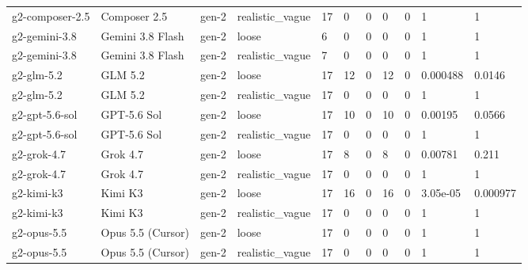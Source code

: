 \begin{tabular}{lllllllllll}
g2-composer-2.5 & Composer 2.5 & gen-2 & realistic\_vague & 17 & 0 & 0 & 0 & 0 & 1 & 1 \\
g2-gemini-3.8 & Gemini 3.8 Flash & gen-2 & loose & 6 & 0 & 0 & 0 & 0 & 1 & 1 \\
g2-gemini-3.8 & Gemini 3.8 Flash & gen-2 & realistic\_vague & 7 & 0 & 0 & 0 & 0 & 1 & 1 \\
g2-glm-5.2 & GLM 5.2 & gen-2 & loose & 17 & 12 & 0 & 12 & 0 & 0.000488 & 0.0146 \\
g2-glm-5.2 & GLM 5.2 & gen-2 & realistic\_vague & 17 & 0 & 0 & 0 & 0 & 1 & 1 \\
g2-gpt-5.6-sol & GPT-5.6 Sol & gen-2 & loose & 17 & 10 & 0 & 10 & 0 & 0.00195 & 0.0566 \\
g2-gpt-5.6-sol & GPT-5.6 Sol & gen-2 & realistic\_vague & 17 & 0 & 0 & 0 & 0 & 1 & 1 \\
g2-grok-4.7 & Grok 4.7 & gen-2 & loose & 17 & 8 & 0 & 8 & 0 & 0.00781 & 0.211 \\
g2-grok-4.7 & Grok 4.7 & gen-2 & realistic\_vague & 17 & 0 & 0 & 0 & 0 & 1 & 1 \\
g2-kimi-k3 & Kimi K3 & gen-2 & loose & 17 & 16 & 0 & 16 & 0 & 3.05e-05 & 0.000977 \\
g2-kimi-k3 & Kimi K3 & gen-2 & realistic\_vague & 17 & 0 & 0 & 0 & 0 & 1 & 1 \\
g2-opus-5.5 & Opus 5.5 (Cursor) & gen-2 & loose & 17 & 0 & 0 & 0 & 0 & 1 & 1 \\
g2-opus-5.5 & Opus 5.5 (Cursor) & gen-2 & realistic\_vague & 17 & 0 & 0 & 0 & 0 & 1 & 1 \\
\bottomrule
\end{tabular}
